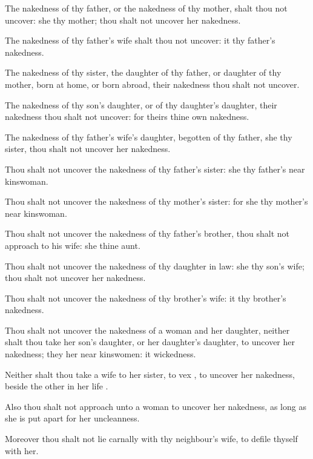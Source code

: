 {The
nakedness of thy
father, or the
nakedness of thy
mother, shalt thou not
uncover: she
{} thy
mother; thou shalt not
uncover her
nakedness.

The
nakedness of thy
father’s
wife shalt thou not
uncover: it
{} thy
father’s
nakedness.

The
nakedness of thy
sister, the
daughter of thy
father, or
daughter of thy
mother,
{}
born at
home, or
born
abroad,
{} their
nakedness thou shalt not
uncover.

The
nakedness of thy
son’s
daughter, or of thy
daughter’s
daughter,
{} their
nakedness thou shalt not
uncover: for
theirs
{} thine own
nakedness.

The
nakedness of thy
father’s
wife’s
daughter,
begotten of thy
father, she
{} thy
sister, thou shalt not
uncover her
nakedness.

Thou shalt not
uncover the
nakedness of thy
father’s
sister: she
{} thy
father’s near
kinswoman.

Thou shalt not
uncover the
nakedness of thy
mother’s
sister: for she
{} thy
mother’s near
kinswoman.

Thou shalt not
uncover the
nakedness of thy
father’s
brother, thou shalt not
approach to his
wife: she
{} thine
aunt.

Thou shalt not
uncover the
nakedness of thy daughter in
law: she
{} thy
son’s
wife; thou shalt not
uncover her
nakedness.

Thou shalt not
uncover the
nakedness of thy
brother’s
wife: it
{} thy
brother’s
nakedness.

Thou shalt not
uncover the
nakedness of a
woman and her
daughter, neither shalt thou
take her
son’s
daughter, or her
daughter’s
daughter, to
uncover her
nakedness;
{} they
{} her near
kinswomen: it
{}
wickedness.

Neither shalt thou
take a
wife to her
sister, to
vex
{}, to
uncover her
nakedness, beside the other in her
life
{}.


\par }{\PP {}Also thou shalt not
approach unto a
woman to
uncover her
nakedness, as long as she is put
apart for her
uncleanness.

Moreover thou shalt
not
lie
carnally with thy
neighbour’s
wife, to
defile thyself with her.

}

